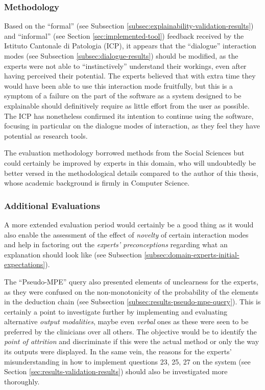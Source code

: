 \subsubsection{Methodology}
Based on the \enquote{formal} (see Subsection \ref{subsec:explainability-validation-results}) and \enquote{informal} (see Section \ref{sec:implemented-tool}) feedback received by the Istituto Cantonale di Patologia (ICP), it appears that the \enquote{dialogue} interaction modes (see Subsection \ref{subsec:dialogue-results}) should be modified, as the experts were not able to \enquote{instinctively} understand their workings, even after having perceived their potential.
The experts believed that with extra time they would have been able to use this interaction mode fruitfully, but this is a symptom of a failure on the part of the software as a system designed to be explainable should definitively require as little effort from the user as possible.
The ICP has nonetheless confirmed its intention to continue using the software, focusing in particular on the dialogue modes of interaction, as they feel they have potential as research tools.

The evaluation methodology borrowed methods from the Social Sciences but could certainly be improved by experts in this domain, who will undoubtedly be better versed in the methodological details compared to the author of this thesis, whose academic background is firmly in Computer Science.

\subsubsection{Additional Evaluations}
A more extended evaluation period would certainly be a good thing as it would also enable the assessment of the effect of \textit{novelty} of certain interaction modes and help in factoring out the \textit{experts' preconceptions} regarding what an explanation should look like (see Subsection \ref{subsec:domain-experts-initial-expectations}).

The \enquote{Pseudo-MPE} query also presented elements of unclearness for the experts, as they were confused on the non-monotonicity of the probability of the elements in the deduction chain (see Subsection \ref{subsec:results-pseudo-mpe-query}).
This is certainly a point to investigate further by implementing and evaluating alternative \textit{output modalities}, maybe even \textit{verbal} ones as these were seen to be preferred by the clinicians over all others.
The objective would be to identify the \textit{point of attrition} and discriminate if this were the actual method or only the way its outputs were displayed.
In the same vein, the reasons for the experts' misunderstanding in how to implement questions 23, 25, 27 on the system (see Section \ref{sec:results-validation-results}) should also be investigated more thoroughly.

